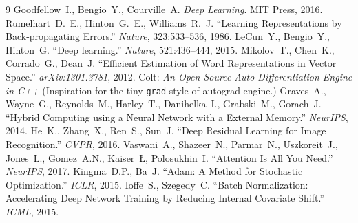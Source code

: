 \documentclass[11pt,a4paper]{book}
\begin{document}
\begin{thebibliography}{9}
 Goodfellow~I., Bengio~Y., Courville~A. \textit{Deep Learning}. MIT Press, 2016.
 Rumelhart~D.~E., Hinton~G.~E., Williams~R.~J. ``Learning Representations by Back-propagating Errors.'' \textit{Nature}, 323:533--536, 1986.
 LeCun~Y., Bengio~Y., Hinton~G. ``Deep learning.'' \textit{Nature}, 521:436--444, 2015.
 Mikolov~T., Chen~K., Corrado~G., Dean~J. ``Efficient Estimation of Word Representations in Vector Space.'' \textit{arXiv:1301.3781}, 2012.
 Colt: \textit{An Open-Source Auto-Differentiation Engine in C++} (Inspiration for the tiny-\texttt{grad} style of autograd engine.)
 Graves~A., Wayne~G., Reynolds~M., Harley~T., Danihelka~I., Grabski~M., Gorach~J. ``Hybrid Computing using a Neural Network with a External Memory.'' \textit{NeurIPS}, 2014.
 He~K., Zhang~X., Ren~S., Sun~J. ``Deep Residual Learning for Image Recognition.'' \textit{CVPR}, 2016.
 Vaswani~A., Shazeer~N., Parmar~N., Uszkoreit~J., Jones~L., Gomez~A.N., Kaiser~\L, Polosukhin~I. ``Attention Is All You Need.'' \textit{NeurIPS}, 2017.
 Kingma~D.P., Ba~J. ``Adam: A Method for Stochastic Optimization.'' \textit{ICLR}, 2015.
 Ioffe~S., Szegedy~C. ``Batch Normalization: Accelerating Deep Network Training by Reducing Internal Covariate Shift.'' \textit{ICML}, 2015.
\end{thebibliography}
\end{document}
